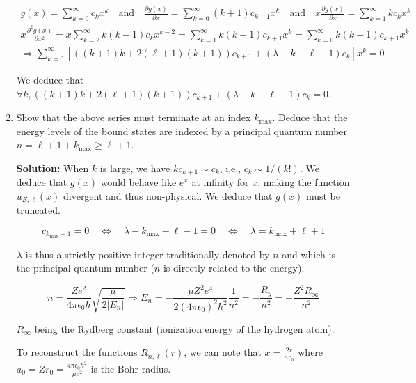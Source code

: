 \documentclass{article}
\begin{document}
\begin{enumerate}
{    $$
    \begin{gathered}
    g(x) = \sum_{k=0}^{\infty} c_{k} x^{k} \quad \text{and} \quad \frac{\partial g(x)}{\partial x} = \sum_{k=0}^{\infty} (k+1) c_{k+1} x^{k} \quad \text{and} \quad x \frac{\partial g(x)}{\partial x} = \sum_{k=1}^{\infty} k c_{k} x^{k} \\
    x \frac{\partial^{2} g(x)}{\partial x^{2}} = x \sum_{k=2}^{\infty} k(k-1) c_{k} x^{k-2} = \sum_{k=1}^{\infty} k(k+1) c_{k+1} x^{k} = \sum_{k=0}^{\infty} k(k+1) c_{k+1} x^{k} \\
    \Rightarrow \sum_{k=0}^{\infty} \left[((k+1) k + 2(\ell+1)(k+1)) c_{k+1} + (\lambda - k - \ell - 1) c_{k}\right] x^{k} = 0
    \end{gathered}
    $$

    We deduce that $\forall k, ((k+1) k + 2(\ell+1)(k+1)) c_{k+1} + (\lambda - k - \ell - 1) c_{k} = 0$.}

    \item Show that the above series must terminate at an index $k_{\max}$. Deduce that the energy levels of the bound states are indexed by a principal quantum number $n = \ell + 1 + k_{\max} \geq \ell + 1$.

    {\color{red}\textbf{Solution:} When $k$ is large, we have $k c_{k+1} \sim c_{k}$, i.e., $c_{k} \sim 1 / (k!)$. We deduce that $g(x)$ would behave like $e^{x}$ at infinity for $x$, making the function $u_{E, \ell}(x)$ divergent and thus non-physical. We deduce that $g(x)$ must be truncated.

    $$
    c_{k_{\max} + 1} = 0 \quad \Leftrightarrow \quad \lambda - k_{\max} - \ell - 1 = 0 \quad \Leftrightarrow \quad \lambda = k_{\max} + \ell + 1
    $$

    $\lambda$ is thus a strictly positive integer traditionally denoted by $n$ and which is the principal quantum number ($n$ is directly related to the energy).

    $$
    n = \frac{Z e^{2}}{4 \pi \epsilon_{0} \hbar} \sqrt{\frac{\mu}{2 \left|E_{n}\right|}} \Rightarrow E_{n} = -\frac{\mu Z^{2} e^{4}}{2 \left(4 \pi \epsilon_{0}\right)^{2} \hbar^{2}} \frac{1}{n^{2}} = -\frac{R_{y}}{n^{2}} = -\frac{Z^{2} R_{\infty}}{n^{2}}
    $$

    $R_{\infty}$ being the Rydberg constant (ionization energy of the hydrogen atom).

    To reconstruct the functions $R_{n, \ell}(r)$, we can note that $x = \frac{2 r}{n r_{0}}$ where $a_{0} = Z r_{0} = \frac{4 \pi \epsilon_{0} \hbar^{2}}{\mu e^{2}}$ is the Bohr radius.

}
\end{enumerate}
\end{document}
